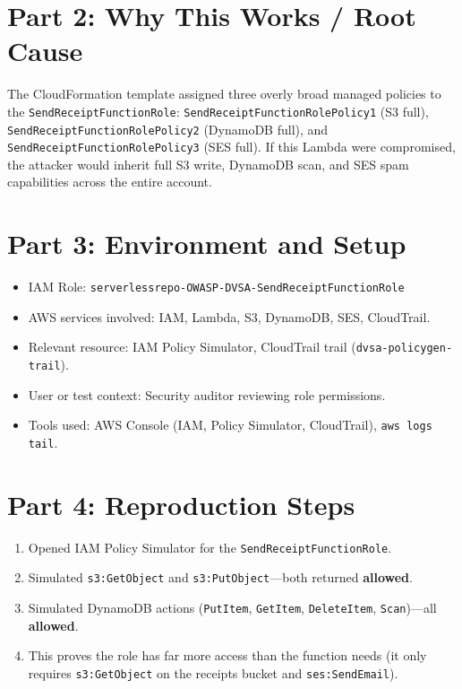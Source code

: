 \documentclass[12pt]{report}
\begin{document}
\section{Part 2: Why This Works / Root Cause}
The CloudFormation template assigned three overly broad managed policies to the \texttt{SendReceiptFunctionRole}: \texttt{SendReceiptFunctionRolePolicy1} (S3 full), \texttt{SendReceiptFunctionRolePolicy2} (DynamoDB full), and \texttt{SendReceiptFunctionRolePolicy3} (SES full). If this Lambda were compromised, the attacker would inherit full S3 write, DynamoDB scan, and SES spam capabilities across the entire account.

\section{Part 3: Environment and Setup}
\begin{itemize}
  \item IAM Role: \texttt{serverlessrepo-OWASP-DVSA-SendReceiptFunctionRole}
  \item AWS services involved: IAM, Lambda, S3, DynamoDB, SES, CloudTrail.
  \item Relevant resource: IAM Policy Simulator, CloudTrail trail (\texttt{dvsa-policygen-trail}).
  \item User or test context: Security auditor reviewing role permissions.
  \item Tools used: AWS Console (IAM, Policy Simulator, CloudTrail), \texttt{aws logs tail}.
\end{itemize}

\section{Part 4: Reproduction Steps}
\begin{enumerate}
  \item Opened IAM Policy Simulator for the \texttt{SendReceiptFunctionRole}.
  \item Simulated \texttt{s3:GetObject} and \texttt{s3:PutObject}---both returned \textbf{allowed}.
  \item Simulated DynamoDB actions (\texttt{PutItem}, \texttt{GetItem}, \texttt{DeleteItem}, \texttt{Scan})---all \textbf{allowed}.
  \item This proves the role has far more access than the function needs (it only requires \texttt{s3:GetObject} on the receipts bucket and \texttt{ses:SendEmail}).
\end{enumerate}
\end{document}
